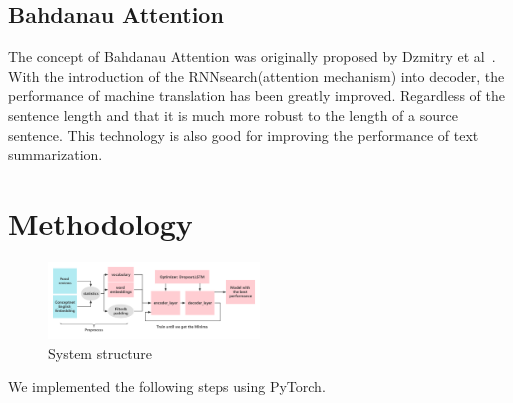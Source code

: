 \documentclass[conference]{IEEEtran}
\begin{document}
\subsection{Bahdanau Attention}
The concept of Bahdanau Attention was originally proposed by Dzmitry et al~\cite{bahdanau2014neural}. With the introduction of the RNNsearch(attention mechanism) into decoder, the performance of machine translation has been greatly improved. Regardless of the sentence length and that it is much more robust to the length of a source sentence. This technology is also good for improving the performance of text summarization. 

\section{Methodology}
\begin{figure}[h]
\centering
\includegraphics[width=0.5\textwidth]{imgs/System_Structure.png}
\caption{System structure}
\label{fig:System_Structure}
\end{figure}
\begin{flushleft} 
We implemented the following steps using PyTorch.
\end{flushleft}
\end{document}
